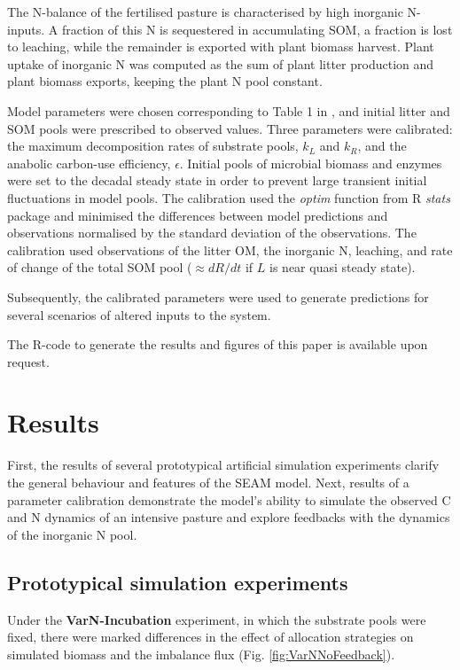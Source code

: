 The N-balance of the fertilised pasture is characterised by high inorganic
N-inputs. A fraction of this N is sequestered in accumulating SOM, a fraction is
lost to leaching, while the remainder is exported with plant biomass harvest.
Plant uptake of inorganic N was computed as the sum of plant litter production
and plant biomass exports, keeping the plant N pool constant.
 
Model parameters were chosen corresponding to Table 1 in \citet{Perveen14}, and
initial litter and SOM pools were prescribed to observed values.
Three parameters were calibrated: the maximum decomposition rates
of substrate pools, $k_L$ and $k_R$, and the anabolic carbon-use efficiency,
$\epsilon$. Initial pools of microbial biomass and enzymes were set to the
decadal steady state in order to prevent large transient initial
fluctuations in model pools. The calibration used the \textit{optim} function
from R \textit{stats} package \citep{R07} and minimised the differences between model
predictions and observations normalised by the standard deviation of the
observations. The calibration used observations of the litter OM, the inorganic
N, leaching, and rate of change of the total SOM pool ($\approx dR/dt$ if $L$ is
near quasi steady state). 

Subsequently, the calibrated parameters were used to generate
predictions for several scenarios of altered inputs to the system.

The R-code to generate the results and figures of this paper is available upon
request. 
 
\section{Results}

First, the results of several prototypical artificial simulation experiments
clarify the general behaviour and features of the SEAM model. Next, results of a
parameter calibration demonstrate the model's ability to
simulate the observed C and N dynamics of an intensive pasture and explore
feedbacks with the dynamics of the inorganic N pool.

\subsection{Prototypical simulation experiments}
\label{sec:ResultsProto}

Under the \textbf{VarN-Incubation} experiment, in which the substrate pools were fixed,
there were marked differences in the effect of allocation strategies on simulated biomass and the imbalance flux (Fig.
\ref{fig:VarNNoFeedback}).
 
